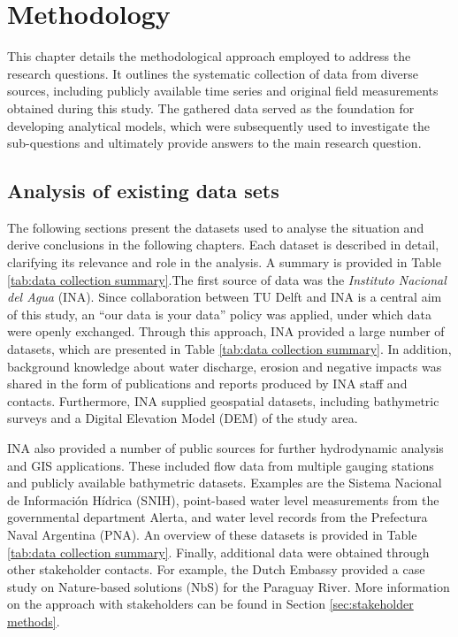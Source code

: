 \chapter{Methodology}
\label{chap:methodology}

This chapter details the methodological approach employed to address the research questions. It outlines the systematic collection of data from diverse sources, including publicly available time series and original field measurements obtained during this study. The gathered data served as the foundation for developing analytical models, which were subsequently used to investigate the sub-questions and ultimately provide answers to the main research question.

\section{Analysis of existing data sets}
\label{sec:desk study}
 The following sections present the datasets used to analyse the situation and derive conclusions in the following chapters. Each dataset is described in detail, clarifying its relevance and role in the analysis. A summary is provided in Table \ref{tab:data collection summary}.The first source of data was the \textit{Instituto Nacional del Agua} (INA). Since collaboration between TU Delft and INA is a central aim of this study, an “our data is your data” policy was applied, under which data were openly exchanged. Through this approach, INA provided a large number of datasets, which are presented in Table \ref{tab:data collection summary}. In addition, background knowledge about water discharge, erosion and negative impacts was shared in the form of publications and reports produced by INA staff and contacts. Furthermore, INA supplied geospatial datasets, including bathymetric surveys and a Digital Elevation Model (DEM) of the study area.

INA also provided a number of public sources for further hydrodynamic analysis and GIS applications. These included flow data from multiple gauging stations and publicly available bathymetric datasets. Examples are the Sistema Nacional de Información Hídrica (SNIH), point-based water level measurements from the governmental department Alerta, and water level records from the Prefectura Naval Argentina (PNA). An overview of these datasets is provided in Table \ref{tab:data collection summary}.
Finally, additional data were obtained through other stakeholder contacts. For example, the Dutch Embassy provided a case study on Nature-based solutions (NbS) for the Paraguay River. More information on the approach with stakeholders can be found in Section \ref{sec:stakeholder methods}.

